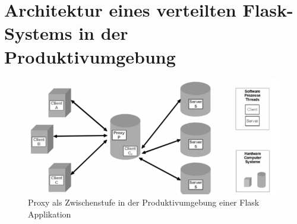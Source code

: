 \documentclass[a4paper,titlepage,halfparskip,12pt,listof=numbered]{scrreprt}
\begin{document}
\chapter{Architektur eines verteilten Flask-Systems in der Produktivumgebung}

\begin{figure}[h]
	\centering
	\includegraphics[width=\linewidth]{images/proxyArchitecture}
	\caption{Proxy als Zwischenstufe in der Produktivumgebung einer Flask Applikation}
	\label{img:proxyArchitecture}
\end{figure}
\end{document}
